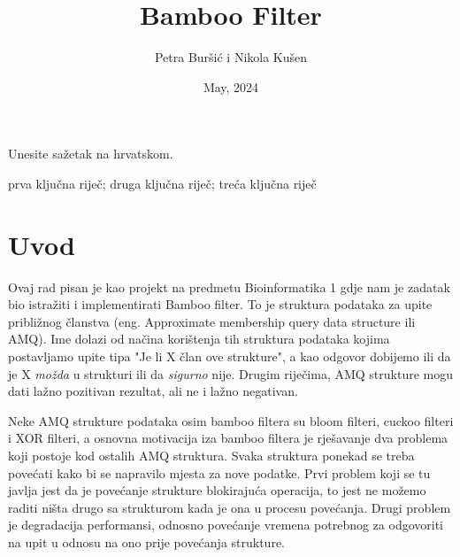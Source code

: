 \documentclass[seminarskirad]{fer}
\title{Bamboo Filter}
\author{Petra Buršić i Nikola Kušen}
\date{May, 2024}
\begin{document}
\maketitle


\mainmatter



\begin{sazetak}
  Unesite sažetak na hrvatskom.

  \blindtext
\end{sazetak}

\begin{kljucnerijeci}
  prva ključna riječ; druga ključna riječ; treća ključna riječ
\end{kljucnerijeci}


\tableofcontents


\chapter{Uvod}
\label{pog:uvod}

Ovaj rad pisan je kao projekt na predmetu Bioinformatika 1 gdje nam je zadatak bio istražiti i implementirati Bamboo filter. To je struktura podataka za upite približnog članstva (eng. Approximate membership query data structure ili AMQ). Ime dolazi od načina korištenja tih struktura podataka kojima postavljamo upite tipa "Je li X član ove strukture", a kao odgovor dobijemo ili da je X \textit{možda} u strukturi ili da \textit{sigurno} nije. Drugim riječima, AMQ strukture mogu dati lažno pozitivan rezultat, ali ne i lažno negativan.

Neke AMQ strukture podataka osim bamboo filtera su bloom filteri, cuckoo filteri i XOR filteri, a osnovna motivacija iza bamboo filtera je rješavanje dva problema koji postoje kod ostalih AMQ struktura. Svaka struktura ponekad se treba povećati kako bi se napravilo mjesta za nove podatke. Prvi problem koji se tu javlja jest da je povećanje strukture blokirajuća operacija, to jest ne možemo raditi ništa drugo sa strukturom kada je ona u procesu povećanja. Drugi problem je degradacija performansi, odnosno povećanje vremena potrebnog za odgovoriti na upit u odnosu na ono prije povećanja strukture.
\end{document}
